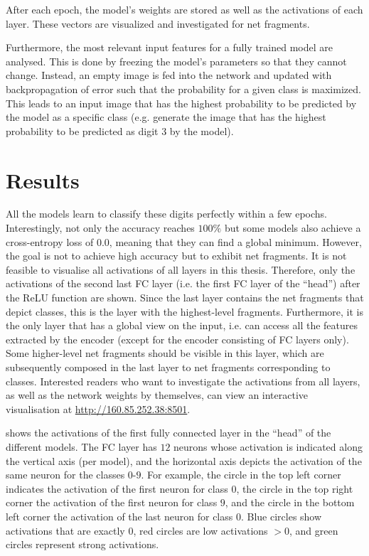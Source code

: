 After each epoch, the model's weights are stored as well as the activations of each layer.
These vectors are visualized and investigated for net fragments.

Furthermore, the most relevant input features for a fully trained model are analysed.
This is done by freezing the model's parameters so that they cannot change.
Instead, an empty image is fed into the network and updated with backpropagation of error such that the probability for a given class is maximized.
This leads to an input image that has the highest probability to be predicted by the model as a specific class (e.g. generate the image that has the highest probability to be predicted as digit $3$ by the model).


\section{Results}
All the models learn to classify these digits perfectly within a few epochs.
Interestingly, not only the accuracy reaches $100\%$ but some models also achieve a cross-entropy loss of $0.0$, meaning that they can find a global minimum.
However, the goal is not to achieve high accuracy but to exhibit net fragments.
It is not feasible to visualise all activations of all layers in this thesis.
Therefore, only the activations of the second last FC layer (i.e. the first FC layer of the ``head'') after the ReLU function are shown.
Since the last layer contains the net fragments that depict classes, this is the layer with the highest-level fragments.
Furthermore, it is the only layer that has a global view on the input, i.e. can access all the features extracted by the encoder (except for the encoder consisting of FC layers only).
Some higher-level net fragments should be visible in this layer, which are subsequently composed in the last layer to net fragments corresponding to classes.
Interested readers who want to investigate the activations from all layers, as well as the network weights by themselves, can view an interactive visualisation at \url{http://160.85.252.38:8501}.

 shows the activations of the first fully connected layer in the ``head'' of the different models.
The FC layer has $12$ neurons whose activation is indicated along the vertical axis (per model), and the horizontal axis depicts the activation of the same neuron for the classes $0$-$9$.
For example, the circle in the top left corner indicates the activation of the first neuron for class $0$, the circle in the top right corner the activation of the first neuron for class $9$, and the circle in the bottom left corner the activation of the last neuron for class $0$.
Blue circles show activations that are exactly $0$, red circles are low activations $>0$, and green circles represent strong activations.

